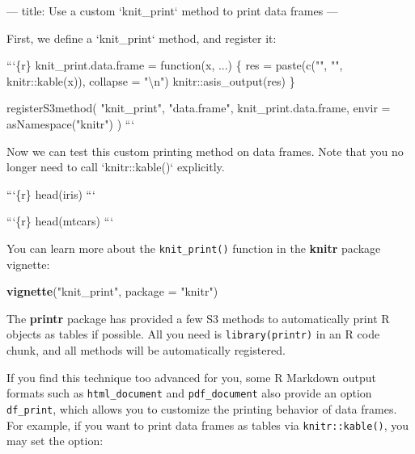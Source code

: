\documentclass[
  11pt,
]{krantz}
\newenvironment{Shaded}{\begin{snugshade}}{\end{snugshade}}
\newcommand{\BaseNTok}[1]{\textcolor[rgb]{0.06,0.06,0.06}{#1}}
\newcommand{\DataTypeTok}[1]{\textcolor[rgb]{0.27,0.27,0.27}{#1}}
\newcommand{\KeywordTok}[1]{\textcolor[rgb]{0.27,0.27,0.27}{\textbf{#1}}}
\newcommand{\NormalTok}[1]{#1}
\newcommand{\StringTok}[1]{\textcolor[rgb]{0.5,0.5,0.5}{#1}}
\begin{document}
\begin{Shaded}
\begin{Highlighting}[]
\NormalTok{---}
\NormalTok{title: Use a custom }\BaseNTok{`knit_print`}\NormalTok{ method to print data frames}
\NormalTok{---}

\NormalTok{First, we define a }\BaseNTok{`knit_print`}\NormalTok{ method, and register it:}

\BaseNTok{```\{r\}}
\BaseNTok{knit_print.data.frame = function(x, ...) \{}
\BaseNTok{  res = paste(c("", "", knitr::kable(x)), collapse = "\textbackslash{}n")}
\BaseNTok{  knitr::asis_output(res)}
\BaseNTok{\}}

\BaseNTok{registerS3method(}
\BaseNTok{  "knit_print", "data.frame", knit_print.data.frame,}
\BaseNTok{  envir = asNamespace("knitr")}
\BaseNTok{)}
\BaseNTok{```}

\NormalTok{Now we can test this custom printing method on data frames.}
\NormalTok{Note that you no longer need to call }\BaseNTok{`knitr::kable()`}
\NormalTok{explicitly.}

\BaseNTok{```\{r\}}
\BaseNTok{head(iris)}
\BaseNTok{```}

\BaseNTok{```\{r\}}
\BaseNTok{head(mtcars)}
\BaseNTok{```}
\end{Highlighting}
\end{Shaded}

You can learn more about the \texttt{knit\_print()} function in the \textbf{knitr} package vignette:

\begin{Shaded}
\begin{Highlighting}[]
\KeywordTok{vignette}\NormalTok{(}\StringTok{"knit_print"}\NormalTok{, }\DataTypeTok{package =} \StringTok{"knitr"}\NormalTok{)}
\end{Highlighting}
\end{Shaded}

The \textbf{printr} package \citep{R-printr} has provided a few S3 methods to automatically print R objects as tables if possible. All you need is \texttt{library(printr)} in an R code chunk, and all methods will be automatically registered.

If you find this technique too advanced for you, some R Markdown output formats such as \texttt{html\_document} and \texttt{pdf\_document} also provide an option \texttt{df\_print}, which allows you to customize the printing behavior of data frames. For example, if you want to print data frames as tables via \texttt{knitr::kable()}, you may set the option:
\end{document}
